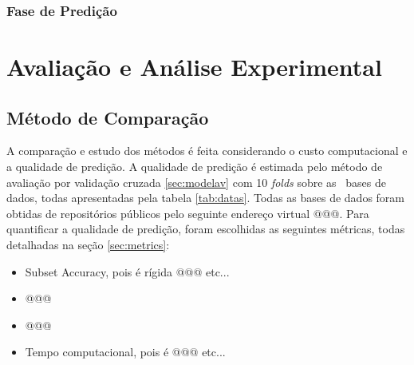  
 \subsection{Fase de Predição}
 
 


%    
%    
%    
%    

 



\chapter{Avaliação e Análise Experimental}
\section{Método de Comparação}
\label{sec:methodcomp}

A comparação e estudo dos métodos é feita considerando o custo computacional e a qualidade de predição.
A qualidade de predição é estimada pelo método de avaliação por validação cruzada \ref{sec:modelav} com 10 \textit{folds}
sobre as \Nbases~bases de dados, todas apresentadas pela tabela \ref{tab:datas}.
Todas as bases de dados foram obtidas de repositórios públicos pelo seguinte
endereço virtual @@@.
Para quantificar a qualidade de predição, foram escolhidas as seguintes métricas, todas detalhadas na seção \ref{sec:metrics}:

\begin{itemize}
 \item Subset Accuracy, pois é rígida @@@ etc...
 \item @@@
 \item @@@
 \item Tempo computacional, pois é @@@ etc...
\end{itemize}

